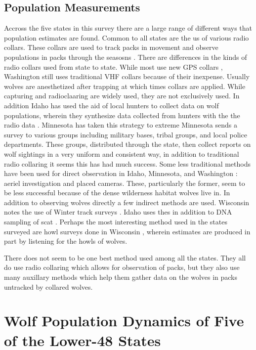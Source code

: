 \documentclass[12pt]{article}
\begin{document}
\subsection{Population Measurements}
Accross the five states in this survey there are a large range of different ways that population estimates are found.
Common to all states are the us of various radio collars.
These collars are used to track packs in movement and observe populations in packs through the seasosns \cite{2015ReportID}.
There are differences in the kinds of radio collars used from state to state.
While most use new GPS collars \cite{WvsInWI} \cite{2018ReportOR} \cite{2015PlanMI},
Washington still uses traditional VHF collars \cite{2019ReportWA} because of their inexpense.
Usually wolves are anesthetized after trapping at which times collars are applied.
While capturing and radioclaaring are widely used, they are not exclusively used.
In addition Idaho has used the aid of local hunters to collect data on wolf populations,
wherein they synthesize data collected from hunters with the the radio data \cite{2015ReportID}.
Minnesota has taken this strategy to extreme \cite{2018ReportMN}
Minnesota sends a survey to various groups including military bases, tribal groups, and local police departments.
These groups, distributed through the state, then collect reports on wolf sightings in a very uniform and consistent way, 
in addition to traditional radio collaring it seems this has had much success.
Some less traditional methods have been used for direct observation in Idaho, Minnesota, and Washington \cite{2015ReportID}:
aeriel investigation and placed cameras.
These, particularly the former, seem to be less successful because of the dense wilderness habitat wolves live in.
In addition to observing wolves directly a few indirect methods are used.
Wisconsin notes the use of Winter track surveys \cite{WvsInWI}.
Idaho uses thes in addition to DNA sampling of scat \cite{2015ReportID}.
Perhaps the most interesting method used in the states surveyed are howl surveys done in Wisconsin \cite{WvsInWI},
wherein estimates are produced in part by listening for the howls of wolves.

There does not seem to be one best method used among all the states.
They all do use radio collaring which allows for observation of packs,
but they also use many auxillary methods which help them gather data on the wolves in packs untracked by collared wolves.

\section{Wolf Population Dynamics of Five of the Lower-48 States}
\end{document}
